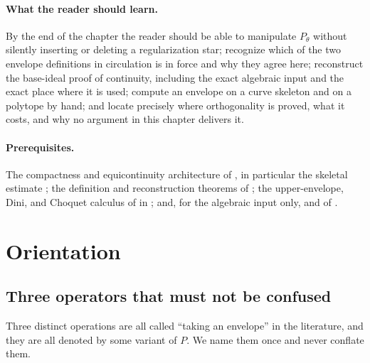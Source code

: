 \paragraph{What the reader should learn.}
By the end of the chapter the reader should be able to
manipulate \(P_\theta\) without silently inserting or deleting a
regularization star; recognize which of the two envelope definitions in
circulation is in force and why they agree here; reconstruct the base-ideal
proof of continuity, including the exact algebraic input and the exact place
where it is used; compute an envelope on a curve skeleton and on a polytope
by hand; and locate precisely where orthogonality is proved, what it costs,
and why no argument in this chapter delivers it.

\paragraph{Prerequisites.}
The compactness and equicontinuity architecture of
, in particular the skeletal estimate
; the definition and reconstruction
theorems of ; the upper-envelope, Dini, and Choquet
calculus of  in ; and,
for the algebraic input only,  and
 of .

\section{Orientation}
\label{sec:ch23-orientation}

\subsection{Three operators that must not be confused}
\label{sec:ch23-three-operators}

Three distinct operations are all called ``taking an envelope'' in the
literature, and they are all denoted by some variant of \(P\).  We name them
once and never conflate them.

